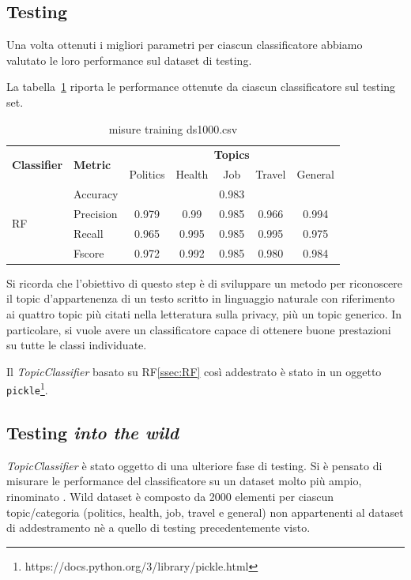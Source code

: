 \subsection{Testing}
\label{ssec:testing_Topic}
Una volta ottenuti i migliori parametri per ciascun classificatore abbiamo valutato le loro performance sul dataset di testing.

La tabella~\ref{tbl:training_ds1000} riporta le performance ottenute da ciascun classificatore sul testing set.
\begin{table}[h]
\begin{tabular}{|l|l|c|c|c|c|c|}
\hline
\multirow{2}{*}{\textbf{Classifier}} & \multirow{2}{*}{\textbf{Metric}} & \multicolumn{5}{c|}{\textbf{Topics}} \\ \cline{3-7} 
 &  & Politics & Health & Job & Travel & General \\ \hline
\multirow{4}{*}{RF} & Accuracy & \multicolumn{5}{c|}{0.983} \\ \cline{2-7} 
 & Precision & 0.979 & 0.99 & 0.985 & 0.966 & 0.994 \\ \cline{2-7} 
 & Recall & 0.965 & 0.995 & 0.985  & 0.995 & 0.975 \\ \cline{2-7} 
 & Fscore & 0.972 & 0.992 & 0.985 & 0.980 & 0.984 \\ \hline
\end{tabular}
\caption{misure training ds1000.csv}
\label{tbl:training_ds1000}
\end{table}
\FloatBarrier
Si ricorda che l'obiettivo di questo step è di sviluppare un metodo per riconoscere il topic d'appartenenza di un testo scritto in linguaggio naturale con riferimento ai quattro topic più citati nella letteratura sulla privacy\cite{looseTweets,dontTweetThis}, più un topic generico. In particolare, si vuole avere un classificatore capace di ottenere buone prestazioni su tutte le classi individuate. 

Il \textit{TopicClassifier} basato su RF\ref{ssec:RF} così addestrato è stato  in un oggetto {\tt pickle}\footnote{https://docs.python.org/3/library/pickle.html}.

\subsection{Testing \textit{into the wild}}
\label{ssec:testing_wild}
\textit{TopicClassifier} è stato oggetto di una ulteriore fase di testing. Si è pensato di misurare le performance del classificatore su un dataset molto più ampio, rinominato . Wild dataset è composto da 2000 elementi per ciascun topic/categoria (politics, health, job, travel e general) non appartenenti al dataset di addestramento nè a quello di testing precedentemente visto.

